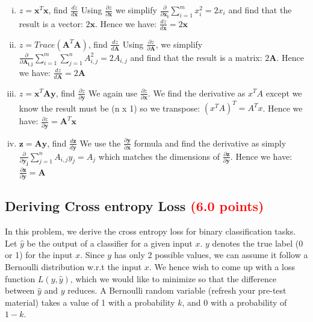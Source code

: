 \documentclass[answers]{exam}
\newcommand{\mypoints}[1]{\textcolor{red}{(#1 points)}}
\begin{document}
\begin{solution}
\begin{enumerate}[i)]
    \item $z=\mathbf{x}^{T}\mathbf{x}$, find $\frac{dz}{d\mathbf{x}}$
    Using $\frac{\partial z}{\partial \mathbf{x}}$ we simplify $\frac{\partial}{\partial \mathbf{x_i}}\sum_{i=1}^{m} x_{i}^{2}=2x_i$ and find that the result is a vector: $2\textbf{x}$. Hence we have: $\frac{dz}{d\mathbf{x}}=2\mathbf{x}$
    \item $z=Trace(\mathbf{A}^{T}\mathbf{A})$, find $\frac{dz}{d\mathbf{A}}$
    Using $\frac{\partial z}{\partial \mathbf{A}}$, we simplify $\frac{\partial}{\partial \mathbf{A_{i,j}}}\sum_{i=1}^{m} \sum_{j=1}^{n} A_{i, j}^{2}=2A_{i,j}$ and find that the result is a matrix: $2\mathbf{A}$. Hence we have: $\frac{dz}{d\mathbf{A}}=2\mathbf{A}$
    \item $z=\mathbf{x}^{T}\mathbf{A}\mathbf{y}$, find $\frac{\partial z}{\partial\mathbf{y}}$
    We again use $\frac{\partial z}{\partial \mathbf{x}}$. We find the derivative as $x^T A$ except we know the result must be (n x 1) so we transpose: $(x^T A)^T = A^T x$. Hence we have: $\frac{\partial z}{\partial\mathbf{y}}=\mathbf{A}^T \mathbf{x}$
    \item $\mathbf{z}=\mathbf{A}\mathbf{y}$, find $\frac{d\mathbf{z}}{d\mathbf{y}}$
    We use the $\frac{\partial \mathbf{y}}{\partial \mathbf{x}}$ formula and find the derivative as simply $\frac{\partial}{\partial\mathbf{y_j}}\sum_{j=1}^{n} A_{i, j} y_{j}=A_j$ which matches the dimensions of $\frac{\partial \mathbf{z}}{\partial \mathbf{y}}$. Hence we have: $\frac{\partial \mathbf{z}}{\partial \mathbf{y}}=\mathbf{A}$
\end{enumerate}
\end{solution}

\subsection{Deriving Cross entropy Loss \mypoints{6.0}}
In this problem, we derive the cross entropy loss for binary classification tasks. Let $\hat{y}$ be the output of a classifier for a given input $x$. $y$ denotes the true label (0 or 1) for the input $x$. Since $y$ has only 2 possible values, we can assume it follow a Bernoulli distribution w.r.t the input $x$. We hence wish to come up with a loss function $L(y, \hat{y})$, which we would like to minimize so that the difference between $\hat{y}$ and $y$ reduces. A Bernoulli random variable (refresh your pre-test material) takes a value of 1 with a probability $k$, and 0 with a probability of $1-k$.  
\end{document}
